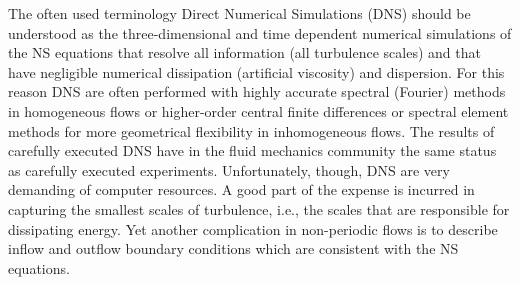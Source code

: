 
The often used terminology Direct Numerical Simulations (DNS) should
be understood as the three-dimensional and time dependent numerical
simulations of the NS equations that resolve all information (all
turbulence scales) and that have negligible numerical dissipation
(artificial viscosity) and dispersion. For this reason DNS are often
performed with highly accurate spectral (Fourier)
methods \cite{Canuto88} in homogeneous flows or higher-order central
finite differences or spectral element methods \cite{semtex} for more
geometrical flexibility in inhomogeneous flows. The results of
carefully executed DNS have in the fluid mechanics community the same
status as carefully executed experiments. Unfortunately, though, DNS
are very demanding of computer resources. A good part of the expense
is incurred in capturing the smallest scales of turbulence, i.e., the
scales that are responsible for dissipating energy. Yet another
complication in non-periodic flows is to describe inflow and outflow
boundary conditions which are consistent with the NS equations.

